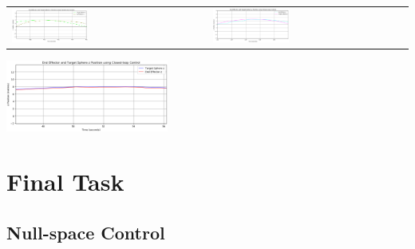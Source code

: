 \documentclass[11pt]{article}
\begin{document}
\begin{center}
    \begin{tabular}{ll}
        \includegraphics[width=0.4\textwidth]{images/3.2x.png}
        &
        \includegraphics[width=0.4\textwidth]{images/3.2y.png}
    \end{tabular}
    \includegraphics[width=0.4\textwidth]{images/3.2z.png}
\end{center}

\section{Final Task}
\setcounter{subsection}{1}
\subsection{Null-space Control}
\end{document}
